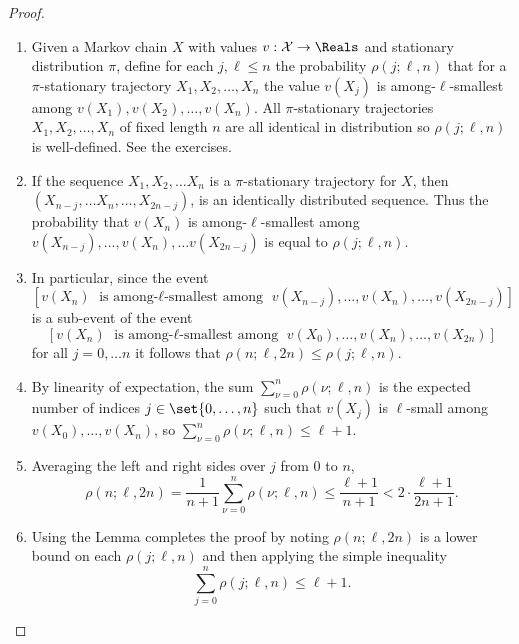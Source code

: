 \documentclass[12pt]{article}
\begin{document}
\begin{proof}
    \begin{enumerate}
        \item
            Given a Markov chain \( X \) with values \( v:  \mathcal{X}
            \to \Reals \) and stationary distribution \( \pi \), define
            for each \( j, \ell \le n \) the probability \( \rho(j; \ell,
            n) \) that for a \( \pi \)-stationary trajectory \( X_1, X_2,
            \dots, X_n \) the value \( v(X_j) \) is among-\( \ell \)-smallest
            among \( v(X_1), v(X_2), \dots, v(X_n) \).   All \(
            \pi \)-stationary trajectories \( X_1, X_2, \dots, X_n \) of
            fixed length \( n \) are all identical in distribution so
            \( \rho(j; \ell, n) \) is well-defined. See the
            exercises.
        \item
            If the sequence \( X_1, X_2, \dots X_n \) is a \(
            \pi \)-stationary trajectory for \( X \), then \( (X_{n-j},
            \dots X_n, \dots, X_{2n-j}) \), is an identically
            distributed sequence.  Thus the probability that \( v(X_n) \)
            is among-\( \ell \)-smallest among \( v(X_{n-j}), \dots, v(X_n),
            \dots v(X_{2n-j}) \) is equal to \( \rho(j; \ell, n) \).  
          \item In
            particular, since the event
            \[
                [v(X_n) \text{ is among-$\ell$-smallest among } v(X_
                {n-j}), \dots, v(X_n), \dots, v(X_{2n-j})]
            \] is a sub-event of the event
            \[
                [v(X_n) \text{ is among-$\ell$-smallest among } v(X_0),
                \dots, v(X_n), \dots, v(X_{2n})]
            \] for all \( j = 0, \dots n \) it follows that \( \rho(n;
            \ell, 2n) \le \rho(j; \ell, n) \).
        \item
            By linearity of expectation, the sum \( \sum_{\nu=0}^n \rho(
            \nu; \ell, n) \) is the expected number of indices \( j \in
            \set{0, \dots, n} \) such that \( v(X_j) \) is \( \ell \)-small
            among \( v(X_0), \dots, v(X_n) \), so \( \sum_{\nu=0}^n \rho
            (\nu; \ell, n) \le \ell + 1 \).
        \item
            Averaging the left and right sides over \( j \) from \( 0 \)
            to \( n \),
            \[
                \rho(n; \ell, 2n) = \frac{1}{n+1} \sum_{\nu=0}^n \rho(\nu;
                \ell, n) \le \frac{\ell + 1}{n+1} < 2 \cdot \frac{\ell+1}
                {2n+1}.
            \]
        \item
            Using the Lemma completes the proof by noting \( \rho(n; \ell,
            2n) \) is a lower bound on each \( \rho(j; \ell, n) \) and
            then applying the simple inequality
            \begin{equation}
                \label{eq:parallelsignificance:eight} \sum\limits_{j=0}^n \rho(j;
                \ell, n) \le \ell + 1.
            \end{equation}
    \end{enumerate}
\end{proof}
\end{document}
